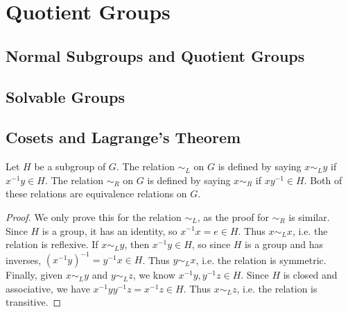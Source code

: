 \documentclass[10pt]{report}
\begin{document}

\chapter{Quotient Groups}


\section{Normal Subgroups and Quotient Groups}





\section{Solvable Groups}




\section{Cosets and Lagrange's Theorem}


\begin{thrm}{}{}
Let $H$ be a subgroup of $G$. The relation $\sim_L$ on $G$ is defined by saying $x \sim_L y$ if $x^{-1}y \in H$. The relation $\sim_R$ on $G$ is defined by saying $x \sim_R$ if $xy^{-1} \in H$. Both of these relations are equivalence relations on $G$.
\end{thrm}
\begin{proof}
	We only prove this for the relation $\sim_L$, as the proof for $\sim_R$ is similar. Since $H$ is a group, it has an identity, so $x^{-1} x = e \in H$. Thus $x \sim_L x$, i.e. the relation is reflexive. If $x \sim_L y$, then $x^{-1}y \in H$, so since $H$ is a group and has inverses, $(x^{-1}y)^{-1}=y^{-1}x\in H$. Thus $y \sim_L x$, i.e. the relation is symmetric. Finally, given $x \sim_L y$ and $y \sim_L z$, we know $x^{-1}y, y^{-1}z \in H$. Since $H$ is closed and associative, we have $x^{-1}yy^{-1}z = x^{-1}z \in H$. Thus $x \sim_L z$, i.e. the relation is transitive.
\end{proof}
\end{document}

